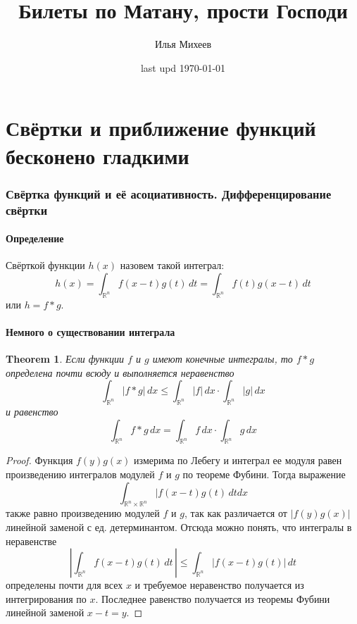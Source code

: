 \documentclass[a4paper,12pt]{article} %
\author{Илья Михеев}
\title{Билеты по Матану, прости Господи}
\date{last upd \today  }
\newtheorem{theorem}{Theorem}
\theoremstyle{definition}
\begin{document}
	
\maketitle 
	
\part{Свёртки и приближение функций бесконено гладкими}
\section{Свёртка функций и её асоциативность. Дифференцирование свёртки}
\subsection{Определение}
Свёрткой функции $h(x)$ назовем такой интеграл:
\begin{equation}
	h(x) = \int_{\mathbb{R}^n} f(x - t) g(t) \, dt = \int_{\mathbb{R}^n} f(t) g(x - t) \, dt 
\end{equation}
или $h= f * g$. 
\subsection{Немного о существовании интеграла}
\begin{theorem}\label{th1} 
	Если функции $f$ и $g$ имеют конечные интегралы, то $f *g$ определена почти всюду и выполняется неравенство
	\begin{equation}
		 \int_{\mathbb{R}^n} |f * g| \, dx  \leq  \int_{\mathbb{R}^n} |f| \, dx  \cdot  \int_{\mathbb{R}^n} |g|\, dx 
	\end{equation}
	и равенство
	\begin{equation}
		 \int_{\mathbb{R}^n} f  * g \, dx  =  \int_{\mathbb{R}^n} f \, dx \cdot  \int_{\mathbb{R}^n} g \, dx 
	\end{equation}
\end{theorem}
\begin{proof}
	Функция $f(y)g(x)$ измерима по Лебегу и интеграл ее модуля равен произведению интегралов модулей $f$ и $g$ по теореме Фубини. Тогда выражение 
	\begin{equation}
		 \int_{\mathbb{R}^n \times \mathbb{R}^n} |f(x - t) g(t) \, dt dx
	\end{equation}
	также равно произведению модулей $f$ и $g$, так как различается от $|f(y) g(x)|$ линейной заменой с ед. детерминантом. Отсюда можно понять, что интегралы в неравенстве
	\begin{equation}
		\left| \int_{\mathbb{R}^n} f(x - t) g(t) \, dt \, \right| \leq  \int_{\mathbb{R}^n} |f(x - t) g(t)| \, dt 
	\end{equation}
	определены почти для всех $x$ и требуемое неравенство получается из интегрирования по $x$. Последнее равенство получается из теоремы Фубини линейной заменой $x - t  = y$.
\end{proof}
\end{document}
